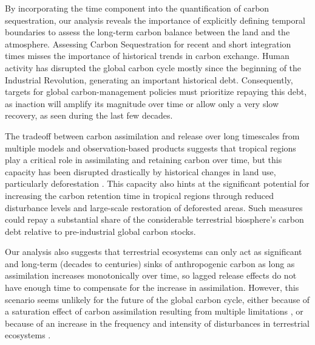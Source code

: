 \documentclass[ProofPDF]{./Styles/Jnls-Template-V3}
\begin{document}
By incorporating the time component into the quantification of carbon sequestration, our analysis reveals the importance of explicitly defining temporal boundaries to assess the long-term carbon balance between the land and the atmosphere. Assessing Carbon Sequestration for recent and short integration times misses the importance of historical trends in carbon exchange. Human activity has disrupted the global carbon cycle mostly since the beginning of the Industrial Revolution, generating an important historical debt. Consequently, targets for global carbon-management policies must prioritize repaying this debt, as inaction will amplify its magnitude over time or allow only a very slow recovery, as seen during the last few decades.

The tradeoff between carbon assimilation and release over long timescales from multiple models and observation-based products suggests that tropical regions play a critical role in assimilating and retaining carbon over time, but this capacity has been disrupted drastically by historical changes in land use, particularly deforestation \citep{Li2022}. This capacity also hints at the significant potential for increasing the carbon retention time in tropical regions through reduced disturbance levels and large-scale restoration of deforested areas. Such measures could repay a substantial share of the considerable terrestrial biosphere's carbon debt relative to pre-industrial global carbon stocks.

Our analysis also suggests that terrestrial ecosystems can only act as significant and long-term (decades to centuries) sinks of anthropogenic carbon as long as assimilation increases monotonically over time, so lagged release effects do not have enough time to compensate for the increase in assimilation. However, this scenario seems unlikely for the future of the global carbon cycle, either because of a saturation effect of carbon assimilation resulting from multiple limitations \citep{Melnikova2021,Friedlingstein2023}, or because of an increase in the frequency and intensity of disturbances in terrestrial ecosystems \citep{Xu2021,Sitch2024}.
\end{document}
